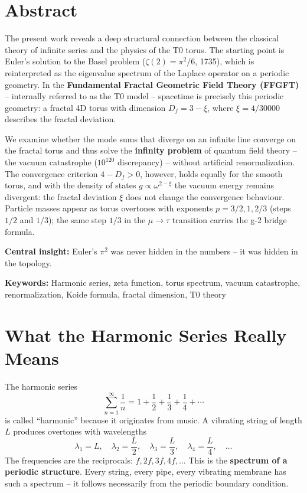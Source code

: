	\section*{Abstract}
	The present work reveals a deep structural connection between the classical theory of infinite series and the physics of the T0 torus. The starting point is Euler's solution to the Basel problem ($\zeta(2) = \pi^2/6$, 1735), which is reinterpreted as the eigenvalue spectrum of the Laplace operator on a periodic geometry. In the \textbf{Fundamental Fractal Geometric Field Theory (FFGFT)} -- internally referred to as the T0 model -- spacetime is precisely this periodic geometry: a fractal 4D torus with dimension $D_f = 3 - \xi$, where $\xi = 4/30000$ describes the fractal deviation.
	
	We examine whether the mode sums that diverge on an infinite line converge on the fractal torus and thus solve the \textbf{infinity problem} of quantum field theory -- the vacuum catastrophe ($10^{120}$ discrepancy) -- without artificial renormalization. The convergence criterion $4 - D_f > 0$, however, holds equally for the smooth torus, and with the density of states $g \propto \omega^{2-\xi}$ the vacuum energy remains divergent: the fractal deviation $\xi$ does not change the convergence behaviour. Particle masses appear as torus overtones with exponents $p = 3/2, 1, 2/3$ (steps $1/2$ and $1/3$); the same step $1/3$ in the $\mu \to \tau$ transition carries the g-2 bridge formula.
	
	\textbf{Central insight:} Euler's $\pi^2$ was never hidden in the numbers -- it was hidden in the topology.
	
	\textbf{Keywords:} Harmonic series, zeta function, torus spectrum, vacuum catastrophe, renormalization, Koide formula, fractal dimension, T0 theory


	\section{What the Harmonic Series Really Means}
	
	The harmonic series
	\begin{equation}
		\sum_{n=1}^{\infty} \frac{1}{n} = 1 + \frac{1}{2} + \frac{1}{3} + \frac{1}{4} + \cdots
		\label{eq:harmonic}
	\end{equation}
	is called ``harmonic'' because it originates from music. A vibrating string of length $L$ produces overtones with wavelengths
	\begin{equation}
		\lambda_1 = L, \quad \lambda_2 = \frac{L}{2}, \quad \lambda_3 = \frac{L}{3}, \quad \lambda_4 = \frac{L}{4}, \quad \ldots
	\end{equation}
	The frequencies are the reciprocals: $f, 2f, 3f, 4f, \ldots$ This is the \textbf{spectrum of a periodic structure}. Every string, every pipe, every vibrating membrane has such a spectrum -- it follows necessarily from the periodic boundary condition.
	
